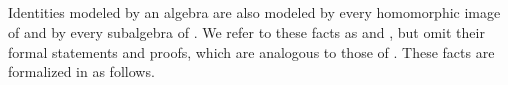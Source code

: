 \begin{code}
\AgdaSpace{}%
\AgdaSpace{}%
\<%
\\
%
\>[2]\AgdaSpace{}%
\AgdaSpace{}%
%
\>[25]\AgdaSpace{}%
\AgdaSymbol{()}\AgdaSpace{}%
\AgdaSpace{}%
\AgdaSymbol{(}\AgdaSpace{}%
\AgdaSpace{}%
\AgdaSpace{}%
\AgdaSpace{}%
\AgdaSymbol{)}\<%
\\
%
\>[2]\AgdaSpace{}%
\AgdaSpace{}%
%
\>[25]\AgdaSpace{}%
\AgdaSymbol{(}\AgdaSpace{}%
\AgdaSpace{}%
\AgdaSymbol{)}\<%
\\
%
\>[2]\AgdaSpace{}%
\AgdaSpace{}%
\AgdaOperator{\AgdaFunction{𝔻[}}\AgdaSpace{}%
\AgdaSpace{}%
\AgdaOperator{\AgdaFunction{]}}\<%
\\
\>[0]\<%
\end{code}
Identities modeled by an algebra  are also modeled by every homomorphic image of
 and by every subalgebra of .
\ifshort
We refer to these facts as  and , but omit their formal
statements and proofs, which are analogous to those of .
\else
These facts are formalized in \agda as follows.

